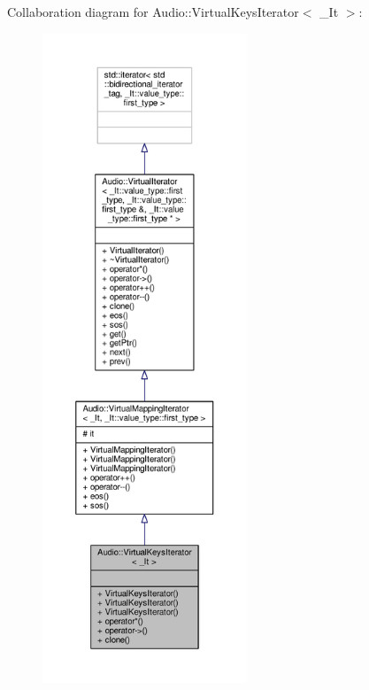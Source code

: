 Collaboration diagram for Audio\+:\+:Virtual\+Keys\+Iterator$<$ \+\_\+\+It $>$\+:
\nopagebreak
\begin{figure}[H]
\begin{center}
\leavevmode
\includegraphics[height=550pt]{d4/d36/classAudio_1_1VirtualKeysIterator__coll__graph}
\end{center}
\end{figure}
